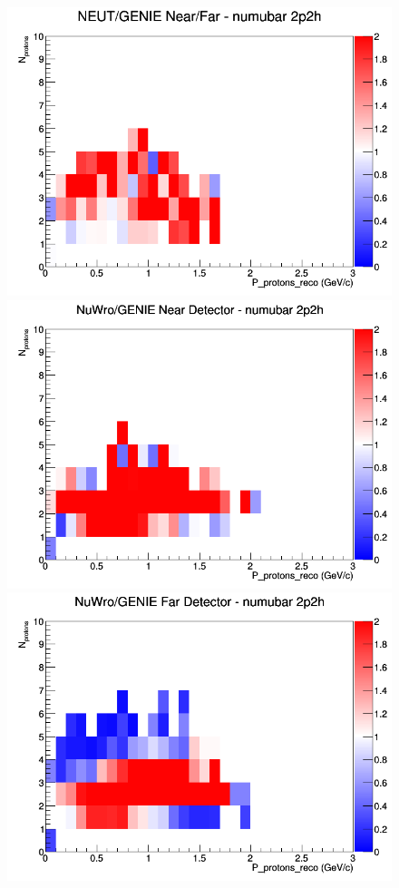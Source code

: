 \begin{figure}[h]
\endminipage
{}
\includegraphics[width=\linewidth]{eff_N_P/FGT/protons/ratios/2p2h_NEUT_GENIE_numubar_NF_N_P.png}
\endminipage
\newline
{}
\includegraphics[width=\linewidth]{eff_N_P/FGT/protons/ratios/2p2h_NuWro_GENIE_numubar_near_N_P.png}
\endminipage
{}
\includegraphics[width=\linewidth]{eff_N_P/FGT/protons/ratios/2p2h_NuWro_GENIE_numubar_far_N_P.png}

\end{figure}
